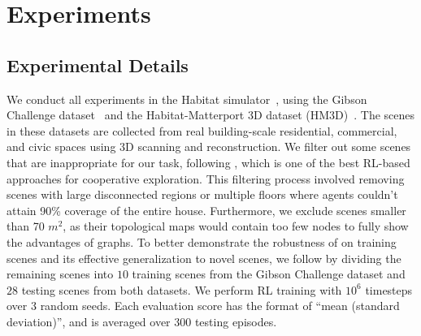 \section{Experiments}

\subsection{Experimental Details}
We conduct all experiments in the Habitat simulator~\cite{habitat}, using the Gibson Challenge dataset~\cite{dataset1} and the Habitat-Matterport 3D dataset (HM3D)~\cite{dataset2}. The scenes in these datasets are collected from real building-scale residential, commercial, and civic spaces using 3D scanning and reconstruction. We filter out some scenes that are inappropriate for our task, following \cite{RL_multi2}, which is one of the best RL-based approaches for cooperative exploration. This filtering process involved removing scenes with large disconnected regions or multiple floors where agents couldn't attain 90\% coverage of the entire house. 
Furthermore, we exclude scenes smaller than 70 $m^2$, as their topological maps would contain too few nodes to fully show the advantages of graphs.
To better demonstrate the robustness of {\name} on training scenes and its effective generalization to novel scenes, we follow \cite{RL_multi2,cvpr22} by dividing the remaining scenes into $10$ training scenes from the Gibson Challenge dataset and $28$ testing scenes from both datasets.
We perform RL training with $10^6$ timesteps over 3 random seeds. Each evaluation score has the format of ``mean (standard deviation)'', and is averaged over 300 testing episodes.





